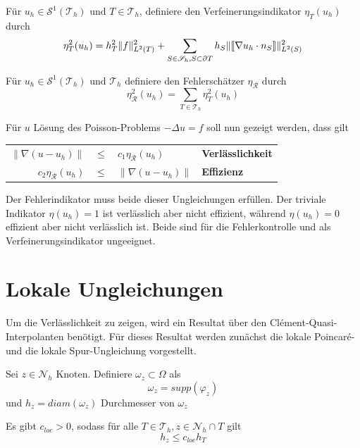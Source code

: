 \begin{definition}[Verfeinerungsindikator]
	Für $u_h \in \mathscr{S}^1(\mathscr{T}_h) \text{ und } T \in \mathscr{T}_h$, definiere den Verfeinerungsindikator $\eta_T(u_h)$ durch
	\[
	\eta^2_T(u_h) = h^2_T\|f\|^2_{L^2(T)} + \sum_{S\in\mathscr{S}_h,S\subset\partial T} h_S\|\llbracket \nabla u_h \cdot n_S\rrbracket\|^2_{L^2(S)} \]
\end{definition}
\begin{definition}[Fehlerschätzer]
	Für $u_h \in \mathscr{S}^1(\mathscr{T}_h) \text{ und } \mathscr{T}_h$ definiere den Fehlerschätzer $\eta_\mathscr{R}$ durch
	\[
	\eta_\mathscr{R}^2(u_h)=\sum_{T\in\mathscr{T}_h} \eta^2_T(u_h)
	\]
\end{definition}
Für $u$ Lösung des Poisson-Problems $-\Delta u = f$ soll nun gezeigt werden, dass gilt \\
\begin{center}
	\begin{tabular}{r c l l}
		$\|\nabla(u-u_h)\|$ & $\leq$ & $c_1 \eta_\mathscr{R}(u_h)$ &\textbf{Verlässlichkeit} \\
		$c_2 \eta_\mathscr{R}(u_h)$ &$\leq$& $\|\nabla(u-u_h)\|$ &\textbf{Effizienz} \\
	\end{tabular}
\end{center}
Der Fehlerindikator muss beide dieser Ungleichungen erfüllen. Der triviale Indikator $\eta(u_h)=1$ ist verlässlich aber nicht effizient, während $\eta(u_h)=0$ effizient aber nicht verlässlich ist. Beide sind für die Fehlerkontrolle und als Verfeinerungsindikator ungeeignet.
\section{Lokale Ungleichungen}
Um die Verlässlichkeit zu zeigen, wird ein Resultat über den Clément-Quasi-Interpolanten benötigt. Für dieses Resultat werden zunächst die lokale Poincaré- und die lokale Spur-Ungleichung vorgestellt.
\begin{definition}
	Sei $z \in \mathscr{N}_h$ Knoten. Definiere $\omega_z \subset \Omega$ als
	\[
	\omega_z = supp(\varphi_z)
	\]
	und $h_z = diam(\omega_z)$ Durchmesser von $\omega_z$
\end{definition}
\begin{bemerkung}
	Es gibt $c_{loc} > 0$, sodass für alle $T \in\mathscr{T}_h, z\in\mathscr{N}_h\cap T$ gilt
	\[
	h_z\leq c_{loc}h_T
	\]
\end{bemerkung}

